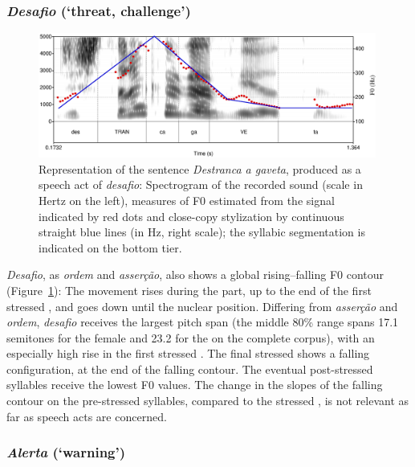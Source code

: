 \documentclass[output=paper]{LSP/langsci}
\begin{document}
\subsubsection{\textit{Desafio} (`threat, challenge')}

\begin{figure}

\includegraphics[width=0.99\textwidth]{figures/MOR6.eps}
\caption{Representation of the sentence \textit{Destranca a gaveta}, produced as a speech act of \textit{desafio}: Spectrogram of the recorded sound (scale in Hertz on the left), measures of F0 estimated from the signal indicated by red dots and close-copy stylization by continuous straight blue lines (in Hz, right scale); the syllabic segmentation is indicated on the bottom tier.}
\label{figure:CC4}
\end{figure}

\textit{Desafio}, as \textit{ordem} and \textit{asserção}, also shows a global rising–falling F0 contour (Figure~\ref{figure:CC4}): The movement rises during the  part, up to the end of the first stressed , and goes down until the nuclear position. 
Differing from \textit{asserção} and \textit{ordem}, \textit{desafio} receives the largest pitch span (the middle 80\% range spans 17.1 semitones for the female and 23.2 for the  on the complete corpus), with an especially high rise in the first stressed . 
The final stressed  shows a falling configuration, at the end of the falling contour. 
The eventual post-stressed syllables receive the lowest F0 values. 
The change in the slopes of the falling contour on the pre-stressed syllables, compared to the stressed , is not relevant as far as speech acts are concerned.


\subsubsection{\textit{Alerta} (`warning')}
\label{corpus:warning}
\end{document}
